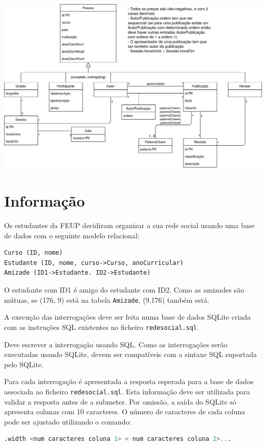 \documentclass[type=recurso, year=2015/16]{bdad_exam}
\begin{document}
{\begin{center}
    \includegraphics[scale=0.246]{2016R_13.png}
\end{center}

\newpage
\section*{Informação}
Os estudantes da FEUP decidiram organizar a sua rede social usando uma base de dados com o seguinte modelo relacional:

\begin{lstlisting}[numbers=none]
Curso (ID, nome)
Estudante (ID, nome, curso->Curso, anoCurricular)
Amizade (ID1->Estudante. ID2->Estudante)
\end{lstlisting}

O estudante com ID1 é amigo do estudante com ID2. Como as amizades são mútuas, se (176, 9) está na tabela \texttt{Amizade}, (9,176) também está.

A execução das interrogações deve ser feita numa base de dados SQLite criada com as instruções SQL existentes no ficheiro \texttt{redesocial.sql}.

Deve escrever a interrogação usando SQL. Como as interrogações serão executadas usando SQLite, devem ser compatíveis com a sintaxe SQL suportada pelo SQLite.

Para cada interrogação é apresentada a resposta esperada para a base de dados associada ao ficheiro \texttt{redesocial.sql}. Esta informação deve ser utilizada para validar a resposta antes de a submeter. Por omissão, a saída do SQLite só apresenta colunas com 10 caracteres. O número de caracteres de cada coluna pode ser ajustado utilizando o comando:

\begin{lstlisting}[language=SQL,numbers=none]
.width <num caracteres coluna 1> < num caracteres coluna 2>...
\end{lstlisting}

}
\end{document}
